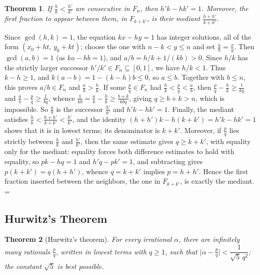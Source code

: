 \documentclass[11pt]{article}
\makeatletter
\let\nt@closedisplay\]
\def\nt@guardedclose{\@ifnextchar\par{\nt@closeafterpar}{\@ifnextchar\end{\postdisplaypenalty\@M\nt@closedisplay}{\nt@closedisplay}}}
\def\nt@closeafterpar\par{\@ifnextchar\par{\nt@closeafterpar}{\@ifnextchar\end{\postdisplaypenalty\@M\nt@closedisplay\par}{\nt@closedisplay\par}}}
\renewenvironment{proof}[1][\proofname]{\par
  \pushQED{\qed}\normalfont\topsep\medskipamount\edef\nt@afterproof{\@endparpenalty=\the\@endparpenalty\relax}\@beginparpenalty\@M\@endparpenalty\@M\let\]\nt@guardedclose\trivlist\item[]\textit{#1\@addpunct{.}} \ignorespaces}{\ifvmode\addpenalty\@M\fi\popQED\nt@afterproof\endtrivlist\@endpefalse}
\theoremstyle{ntstyle}
\newtheorem{theorem}{Theorem}[subsection]
\makeatother
\begin{document}
\begin{theorem}\label{thm:10.4.1} If $\tfrac{h}{k}<\tfrac{h'}{k'}$ are consecutive in $F_n$, then $h'k-hk'=1$.
  Moreover, the first fraction to appear between them, in $F_{k+k'}$, is
  their mediant $\tfrac{h+h'}{k+k'}$.

\end{theorem}

\begin{proof} Since $\gcd(h, k)=1$, the equation $kx-hy=1$
  has integer solutions, all of the form $(x_0+ht,\,y_0+kt)$; choose
  the one with $n-k<y\le n$ and set $\tfrac{a}{b}=\tfrac{x}{y}$. Then
  $\gcd(a, b)=1$ (as $ka-hb=1$), and $a/b=h/k+1/(kb)>0$.
  Since $h/k$ has the strictly larger successor $h'/k'\in F_n\subseteq[0,1]$,
  we have $h/k<1$. Thus $k-h\ge1$, and $k(a-b)=1-(k-h)b\le0$, so $a\le b$. Together with $b\le n$, this proves
  $a/b\in F_n$ and $\tfrac{a}{b}>\tfrac{h}{k}$. If some $\tfrac{p}{q}\in F_n$ had
  $\tfrac{h}{k}<\tfrac{p}{q}<\tfrac{a}{b}$, then $\tfrac{p}{q}-\tfrac{h}{k}\ge\tfrac{1}{kq}$ and
  $\tfrac{a}{b}-\tfrac{p}{q}\ge\tfrac{1}{bq}$, whence
  $\tfrac{1}{kb}=\tfrac{a}{b}-\tfrac{h}{k}\ge\tfrac{b+k}{kbq}$, giving $q\ge b+k>n$, which is impossible. So
  $\tfrac{a}{b}$ is the successor
  $\tfrac{h'}{k'}$ and $h'k-hk'=1$. Finally, the mediant satisfies
  $\tfrac{h}{k}<\tfrac{h+h'}{k+k'}<\tfrac{h'}{k'}$, and the identity
  $(h+h')k-h(k+k')=h'k-hk'=1$ shows that it is in lowest terms; its
  denominator is $k+k'$. Moreover, if $\tfrac{p}{q}$ lies strictly between
  $\tfrac{h}{k}$ and $\tfrac{h'}{k'}$, then the same estimate gives
  $q\ge k+k'$, with equality only for the mediant: equality forces both
  difference estimates to hold with equality, so $pk-hq=1$ and $h'q-pk'=1$, and
  subtracting gives $p(k+k')=q(h+h')$, whence $q=k+k'$ implies $p=h+h'$.
  Hence the first
  fraction inserted between the neighbors, the one in $F_{k+k'}$, is
  exactly the mediant.
\end{proof}
\subsection{Hurwitz's Theorem}

\begin{theorem}[Hurwitz's theorem]\label{thm:10.5.1}\label{thm:hurwitz-theorem}
  For every irrational
  $\alpha$, there are infinitely many rationals $\tfrac{p}{q}$, written in
  lowest terms with $q\ge1$, such that
  $\big|\alpha-\tfrac{p}{q}\big|<\dfrac{1}{\sqrt{5}\,q^2}$; the constant
  $\sqrt{5}$ is best possible.

\end{theorem}
\end{document}
